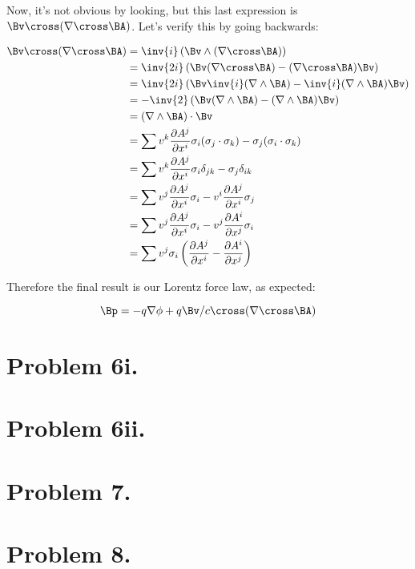 \documentclass{article}
\newcommand{\grad}[0]{\nabla}
\newcommand{\PD}[2]{\frac{\partial {#2}}{\partial {#1}}}
\begin{document}
Now, it's not obvious by looking, but this last expression is $\Bv \cross (\grad \cross \BA)$.  Let's verify this by going backwards:

\begin{align*}
\Bv \cross (\grad \cross \BA)
&= \inv{i} \left( \Bv \wedge ( \grad \cross \BA )\right) \\
&= \inv{2i} \left( \Bv ( \grad \cross \BA ) - ( \grad \cross \BA ) \Bv \right) \\
&= \inv{2i} \left( \Bv \inv{i} ( \grad \wedge \BA ) - \inv{i} ( \grad \wedge \BA ) \Bv \right) \\
&= -\inv{2} \left( \Bv ( \grad \wedge \BA ) - ( \grad \wedge \BA ) \Bv \right) \\
&= ( \grad \wedge \BA ) \cdot \Bv \\
&= \sum v^k \PD{x^i}{A^j} \sigma_i (\sigma_j \cdot \sigma_k) - \sigma_j (\sigma_i \cdot \sigma_k) \\
&= \sum v^k \PD{x^i}{A^j} \sigma_i \delta_{jk} - \sigma_j \delta_{ik} \\
&= \sum v^j \PD{x^i}{A^j} \sigma_i -v^i \PD{x^i}{A^j} \sigma_j \\
&= \sum v^j \PD{x^i}{A^j} \sigma_i -v^j \PD{x^j}{A^i} \sigma_i \\
&= \sum v^j \sigma_i \left(\PD{x^i}{A^j} - \PD{x^j}{A^i} \right) \\
\end{align*}

Therefore the final result is our Lorentz force law, as expected:

\begin{equation*}
\Bp = -q \grad \phi + q \Bv/c \cross (\grad \cross \BA)
\end{equation*}

\section{ Problem 6i. }
\section{ Problem 6ii. }

\section{ Problem 7. }
\section{ Problem 8. }
\end{document}
